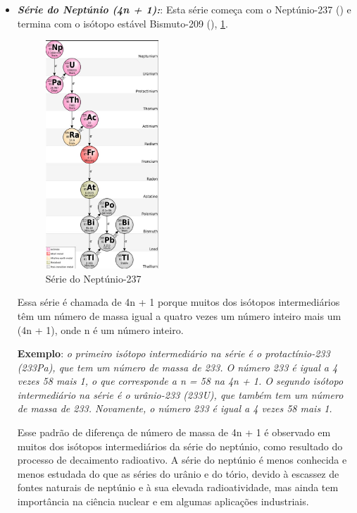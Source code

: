 \documentclass[11pt,a4paper]{article}
\begin{document}
\begin{itemize}
                    \item \textbf{\textit{\textcolor{CarnationPink}{Série do Neptúnio (4n + 1):}}}: Esta série começa com o Neptúnio-237 () e termina com o isótopo estável Bismuto-209 (), \ref{fig:serieDoNeptunio}. 
                    
                        \begin{figure}[h]
                            \centering
                            \includegraphics[width=0.4\textwidth]{Imagens/serieDoNeptunio.jpg}
                            \caption{Série do Neptúnio-237}
                            \label{fig:serieDoNeptunio}
                        \end{figure}
                    
                        Essa série é chamada de 4n + 1 porque muitos dos isótopos intermediários têm um número de massa igual a quatro vezes um número inteiro mais um (4n + 1), onde n é um número inteiro.
                    
                        \textbf{Exemplo}: \textit{ o primeiro isótopo intermediário na série é o protactínio-233 (233Pa), que tem um número de massa de 233. O número 233 é igual a 4 vezes 58 mais 1, o que corresponde a n = 58 na  4n + 1. O segundo isótopo intermediário na série é o urânio-233 (233U), que também tem um número de massa de 233. Novamente, o número 233 é igual a 4 vezes 58 mais 1.}

                        Esse padrão de diferença de número de massa de 4n + 1 é observado em muitos dos isótopos intermediários da série do neptúnio, como resultado do processo de decaimento radioativo. A série do neptúnio é menos conhecida e menos estudada do que as séries do urânio e do tório, devido à escassez de fontes naturais de neptúnio e à sua elevada radioatividade, mas ainda tem importância na ciência nuclear e em algumas aplicações industriais.


\end{itemize}
\end{document}
